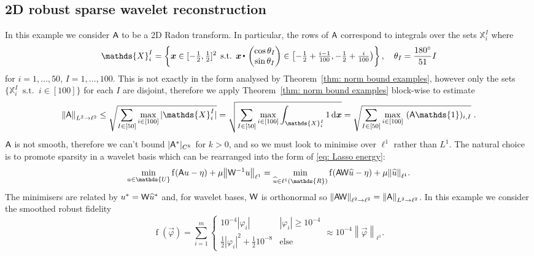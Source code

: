\documentclass[smallextended]{svjour3}
\let\F\mathds\let\C\mathcal\newcommand{\R}{\F{R}}\newcommand{\A}{\tens{A}}
\newcommand{\norm}[1]{{\left\lVert #1 \right\rVert}}
\newcommand{\ip}[2]{#1 \vcenter{\hbox{\resizebox{6pt}{!}{\ensuremath\cdot}}} #2}
\newcommand{\op}[1]{\operatorname{#1}}
\newcommand{\splitln}[4]{\begin{cases} #1 & #2 \\ #3 & #4\end{cases}}
\newcommand{\1}{\F{1}}
\DeclareMathOperator{\st}{\;s.t.\;}
\renewcommand{\hat}{\widehat}\renewcommand{\tilde}{\widetilde}
\newcommand{\diff}{\mathop{}\!\mathrm{d}}
\newcommand{\data}{\eta}
\newcommand*{\var}[1]{%
	\IfEqCase{#1}{%
		{0}{u}%
		{1}{v}%
		{2}{w}%
	}[u#1]%
}
\begin{document}
	\subsection{2D robust sparse wavelet reconstruction}\label{sec: wavelet examples}
	In this example we consider $\A$ to be a 2D Radon transform. In particular, the rows of $\A$ correspond to integrals over the sets $\F{X}^I_i$ where 
	\begin{equation}
		\F{X}_i^I = \left\{\vec{x}\in[-\tfrac12,\tfrac12]^2\st \ip{\vec{x}}{\begin{pmatrix}\cos\theta_I\\\sin\theta_I\end{pmatrix}}\in \left[-\tfrac12+\tfrac{i-1}{100},-\tfrac12+\tfrac{i}{100}\right)\right\}, \quad \theta_I=\frac{180^\circ}{51}I
	\end{equation}
	for $i=1,\ldots,50$, $I=1,\ldots,100$.
	This is not exactly in the form analysed by Theorem~\ref{thm: norm bound examples}, however only the sets $\{\F{X}^I_i\st i\in[100]\}$ for each $I$ are disjoint, therefore we apply Theorem~\ref{thm: norm bound examples} block-wise to estimate
	\begin{equation}
		\norm{\A}_{L^2\to\ell^2} \leq \sqrt{\sum_{I\in[50]}\max_{i\in[100]} |\F{X}^I_i|} = \sqrt{\sum_{I\in[50]}\max_{i\in[100]} \int_{\F{X}^I_i}1\diff\vec{x}}= \sqrt{\sum_{I\in[50]}\max_{i\in[100]}\ (\A\1)_{i,I}}\;.
	\end{equation}
	$\A$ is not smooth, therefore we can't bound $|\A^*|_{C^k}$ for $k>0$, and so we must look to minimise over $\ell^1$ rather than $L^1$. The natural choice is to promote sparsity in a wavelet basis which can be rearranged into the  form of \eqref{eq: Lasso energy}:
	\begin{equation}
		\min_{\var0\in \F{U}} \op{f}(\A\var0-\data) + \mu \norm{\tens{W}^{-1}\var0}_{\ell^1} = \min_{\hat{\var0}\in\ell^1(\R)} \op{f}(\A\tens{W}\hat{\var0}-\data) + \mu \norm{\hat{\var0}}_{\ell^1}.
	\end{equation}
	The minimisers are related by $\var0^* = \tens{W}\hat{\var0}^*$ and, for wavelet bases, $\mathsf{W}$ is orthonormal so $\norm{\A\tens{W}}_{\ell^2\to\ell^2} = \norm{\A}_{L^2\to\ell^2}$. 
	 In this example we consider the smoothed robust fidelity \cite{Rosset2007}
		\begin{equation}
			\op{f}(\vec{\varphi}) = \sum_{i=1}^m \splitln{10^{-4}|\varphi_i|}{|\varphi_i|\geq10^{-4}}{\tfrac12|\varphi_i|^2+\tfrac12 10^{-8}}{\text{else}} \approx 10^{-4}\norm{\vec{\varphi}}_{\ell^1}.
		\end{equation}
\end{document}
